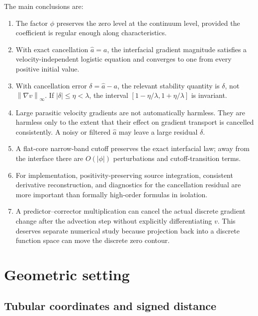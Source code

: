 \documentclass[11pt,a4paper]{article}
\theoremstyle{definition}
\theoremstyle{remark}
\newcommand{\norm}[1]{\left\lVert #1\right\rVert}
\newcommand{\abs}[1]{\left\lvert #1\right\rvert}
\begin{document}
The main conclusions are:
\begin{enumerate}
  \item The factor $\phi$ preserves the zero level at the continuum level, provided the coefficient is regular enough along characteristics.
  \item With exact cancellation $\widehat a=a$, the interfacial gradient magnitude satisfies a velocity-independent logistic equation and converges to one from every positive initial value.
  \item With cancellation error $\delta=\widehat a-a$, the relevant stability quantity is $\delta$, not $\norm{\nabla v}_{\infty}$. If $\abs\delta\le\eta<\lambda$, the interval $[1-\eta/\lambda,1+\eta/\lambda]$ is invariant.
  \item Large parasitic velocity gradients are not automatically harmless. They are harmless only to the extent that their effect on gradient transport is cancelled consistently. A noisy or filtered $\widehat a$ may leave a large residual $\delta$.
  \item A flat-core narrow-band cutoff preserves the exact interfacial law; away from the interface there are $O(\abs\phi)$ perturbations and cutoff-transition terms.
  \item For implementation, positivity-preserving source integration, consistent derivative reconstruction, and diagnostics for the cancellation residual are more important than formally high-order formulas in isolation.
  \item A predictor--corrector multiplication can cancel the actual discrete gradient change after the advection step without explicitly differentiating $v$. This deserves separate numerical study because projection back into a discrete function space can move the discrete zero contour.
\end{enumerate}

\section{Geometric setting}

\subsection{Tubular coordinates and signed distance}
\end{document}
